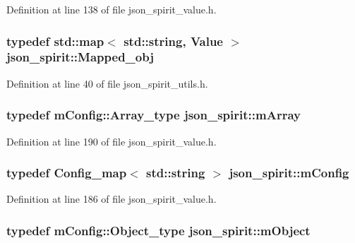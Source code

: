 Definition at line 138 of file json\+\_\+spirit\+\_\+value.\+h.

\hypertarget{namespacejson__spirit_a739353ac8509b778792f15eed140b5e8}{}
\subsubsection[{Mapped\+\_\+obj}]{\setlength{\rightskip}{0pt plus 5cm}typedef std\+::map$<$ std\+::string, {\bf Value} $>$ {\bf json\+\_\+spirit\+::\+Mapped\+\_\+obj}}\label{namespacejson__spirit_a739353ac8509b778792f15eed140b5e8}


Definition at line 40 of file json\+\_\+spirit\+\_\+utils.\+h.

\hypertarget{namespacejson__spirit_ad8188045899c36f157d67e13b277fa36}{}
\subsubsection[{m\+Array}]{\setlength{\rightskip}{0pt plus 5cm}typedef {\bf m\+Config\+::\+Array\+\_\+type} {\bf json\+\_\+spirit\+::m\+Array}}\label{namespacejson__spirit_ad8188045899c36f157d67e13b277fa36}


Definition at line 190 of file json\+\_\+spirit\+\_\+value.\+h.

\hypertarget{namespacejson__spirit_a289a50461fb90a7771e9956489ab53d0}{}
\subsubsection[{m\+Config}]{\setlength{\rightskip}{0pt plus 5cm}typedef {\bf Config\+\_\+map}$<$ std\+::string $>$ {\bf json\+\_\+spirit\+::m\+Config}}\label{namespacejson__spirit_a289a50461fb90a7771e9956489ab53d0}


Definition at line 186 of file json\+\_\+spirit\+\_\+value.\+h.

\hypertarget{namespacejson__spirit_a235e5d2ccd2bbf3b05ca082988cd6d33}{}
\subsubsection[{m\+Object}]{\setlength{\rightskip}{0pt plus 5cm}typedef {\bf m\+Config\+::\+Object\+\_\+type} {\bf json\+\_\+spirit\+::m\+Object}}\label{namespacejson__spirit_a235e5d2ccd2bbf3b05ca082988cd6d33}


